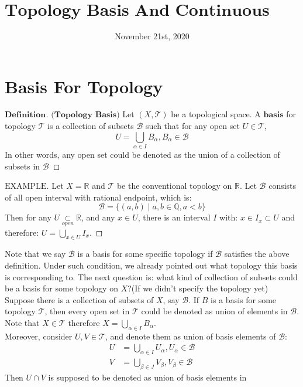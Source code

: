 \documentclass[a4paper, 11pt]{article}
\title{$\textbf{Topology Basis And Continuous Functions}$}
\date{November 21st, 2020}
\theoremstyle{definition}
\theoremstyle{remark}
\newenvironment{mydef}
{\renewcommand\qedsymbol{$ $}\begin{proof}[$\mathbf{Definition}$]}
  {\end{proof}}
\newenvironment{myexam}
{\renewcommand\qedsymbol{$ $}\begin{proof}[$\mathrm{EXAMPLE}$]}
  {\end{proof}}
\theoremstyle{definition}
\begin{document}
       \maketitle 
\section{Basis For Topology}
\begin{mydef}$\textbf{(Topology Basis)}$ Let $(X,\mathcal{T})$ be a topological 
        space. A $\textbf{basis}$ for topology $\mathcal{T}$ is a collection
        of subsets $\mathcal{B}$ such that for any open set $U\in \mathcal{T}$,
        $$
        U=\bigcup_{\alpha\in I} B_{\alpha}, B_{\alpha}\in \mathcal{B}
        $$ In other words, any open set could be denoted as the union of a 
        collection of subsets in $\mathcal{B}$
\end{mydef}
\vspace{0.5cm}
\begin{myexam}
       Let $X=\mathbb{R}$ and $\mathcal{T}$ be the conventional topology on 
       $\mathbb{R}$. Let $\mathcal{B}$ consists of all open interval with 
       rational endpoint, which is:
        $$
        \mathcal{B}=\{(a,b)\mid a,b\in \mathbb{Q},a<b\}
        $$ Then for any $\displaystyle U \underset{open}{\subset} \mathbb{R}$, 
        and any $x\in U$, there is an interval $I$ with: $x\in I_x\subset U$ and
        therefore: $\displaystyle U=\bigcup_{x\in U} I_x$.
\end{myexam}
\vspace{0.5cm}
Note that we say $\mathcal{B}$ is a basis for some specific topology if 
$\mathcal{B}$ satisfies the above definition. Under such condition, we already 
pointed out what topology this basis is corresponding to.
The next question is: what kind of
collection of subsets could be a basis for some topology on $X$?(If we didn't
specify the topology yet)\\
\indent
Suppose there is a collection of subsets of $X$, say $\mathcal{B}$. If $B$ is 
a basis for some topology $\mathcal{T}$, then every open set in $\mathcal{T}$
could be denoted as union of elements in $\mathcal{B}$. Note that 
$X\in \mathcal{T}$ therefore $X=\displaystyle \bigcup_{\alpha\in I}B_{\alpha}$.\\
\indent
Moreover, consider $U,V\in \mathcal{T}$, and denote them as union of basis 
elements of $\mathcal{B}$:
$$
\begin{aligned}
        U&=\bigcup_{\alpha\in I}U_{\alpha},U_{\alpha}\in \mathcal{B}\\
        V&=\bigcup_{\beta\in J}V_{\beta},V_{\beta}\in \mathcal{B}
\end{aligned}
$$ Then $U\cap V$ is supposed to be denoted as union of basis elements in 
\end{document}
